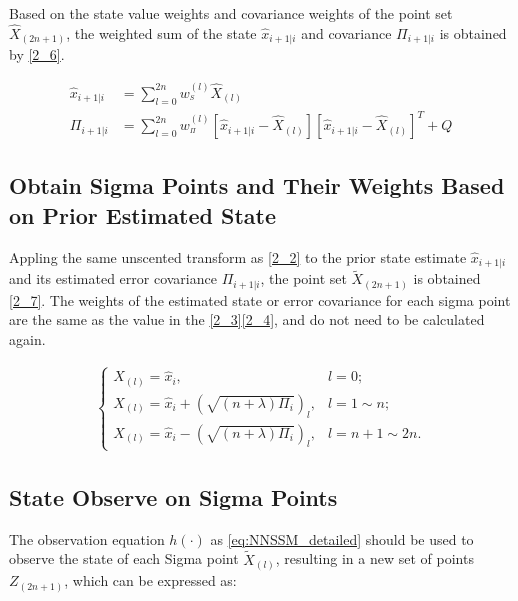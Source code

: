 \documentclass[sn-nature]{sn-jnl}%
\theoremstyle{thmstyleone}%
\theoremstyle{thmstyletwo}%
\theoremstyle{thmstylethree}%
\begin{document}
Based on the state value weights and covariance weights of the point set ${{\hat X}_{(2n + 1)}}$, the weighted sum of the state ${{\hat x}_{i + 1|i}}$ and covariance ${{\Pi _{i + 1|i}}}$ is obtained by \eqref{2_6}.

\begin{equation}
\begin{aligned}
{{\hat x}_{i + 1|i}} &= \sum\limits_{l = 0}^{2n} {w_{^S}^{(l)}{{\hat X}_{(l)}}} \\
{\Pi _{i + 1|i}} &= \sum\limits_{l = 0}^{2n} {w_{^\Pi }^{(l)}[{{\hat x}_{i + 1|i}} - {{\hat X}_{(l)}}]} {[{{\hat x}_{i + 1|i}} - {{\hat X}_{(l)}}]^T} + Q
\end{aligned}
\label{2_6}
\end{equation}

\subsection{Obtain Sigma Points and Their Weights Based on Prior Estimated State}

Appling the same unscented transform as \eqref{2_2} to the prior state estimate ${{\hat x}_{i + 1|i}}$ and its estimated error covariance ${{\Pi _{i + 1|i}}}$, the point set ${{\tilde X}_{(2n + 1)}}$ is obtained \eqref{2_7}. The weights of the estimated state or error covariance for each sigma point are the same as the value in the \eqref{2_3}\eqref{2_4}, and do not need to be calculated again.

\begin{equation}
\begin{array}{l}
\left\{ {\begin{array}{*{20}{l}}
{{X_{(l)}} = {{\hat x}_i},}&{l = 0};\\
{{X_{(l)}} = {{\hat x}_i} + {{(\sqrt {(n + \lambda ){\Pi _i}} )}_l},}&{l = 1\sim n};\\
{{X_{(l)}} = {{\hat x}_i} - {{(\sqrt {(n + \lambda ){\Pi _i}} )}_l},}&{l = n + 1\sim 2n}.
\end{array}} \right.
\end{array}
\label{2_7}
\end{equation}

\subsection{State Observe on Sigma Points}

The observation equation $h( \cdot )$ as \eqref{eq:NNSSM_detailed} should be used to observe the state of each Sigma point ${{\tilde X}_{(l)}}$, resulting in a new set of points ${Z_{(2n + 1)}}$, which can be expressed as:
\end{document}
